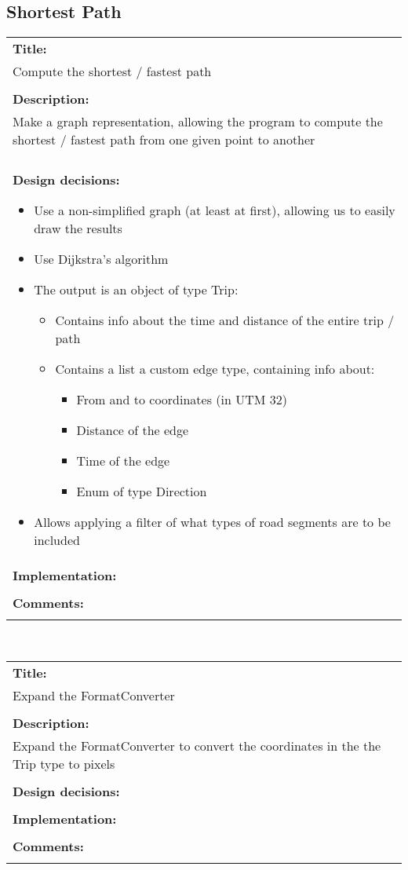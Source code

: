 \subsection*{Shortest Path}
\begin{tabular}{ | p{12cm} | }
	\hline
	\textbf{Title:} \\ 
	Compute the shortest / fastest path \\ 
	\\ \hline
	\textbf{Description:} \\
	Make a graph representation, allowing the program to compute the shortest / fastest path from one given point to another \\
	\\ \hline
	\textbf{Design decisions:}
	\begin{itemize}
		\item Use a non-simplified graph (at least at first), allowing us to easily draw the results
		\item Use Dijkstra’s algorithm
		\item The output is an object of type Trip:
		\begin{itemize}
			\item Contains info about the time and distance of the entire trip / path
			\item Contains a list a custom edge type, containing info about:
			\begin{itemize}
				\item From and to coordinates (in UTM 32)
				\item Distance of the edge
				\item Time of the edge
				\item Enum of type Direction
			\end{itemize}
		\end{itemize}
		\item Allows applying a filter of what types of road segments are to be included
	\end{itemize}
	\\ \hline
	\textbf{Implementation:} \\
	\\ \hline
	\textbf{Comments:} \\
	\\ \hline
\end{tabular} \\
\begin{tabular}{ | p{12cm} | }
	\hline
	\textbf{Title:} \\
	Expand the FormatConverter \\
	\\ \hline
	\textbf{Description:} \\
	Expand the FormatConverter to convert the coordinates in the the Trip type to pixels \\
	\\ \hline
	\textbf{Design decisions:} \\
	\\ \hline
	\textbf{Implementation:} \\
	\\ \hline
	\textbf{Comments:} \\
	\\ \hline
\end{tabular} \\
